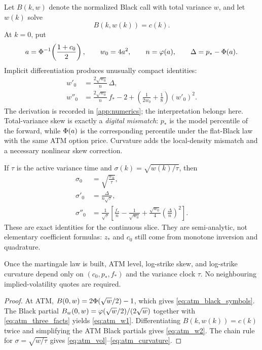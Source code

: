 \documentclass[11pt]{article}
\begin{document}
Let $B(k,w)$ denote the normalized Black call with total variance $w$, and let
$w(k)$ solve
\begin{equation}
B(k,w(k))=c(k).
\label{eq:black_inversion}
\end{equation}
At $k=0$, put
\begin{equation}
a=\Phi^{-1}\!\left(\frac{1+c_0}{2}\right),\qquad
w_0=4a^2,\qquad n=\varphi(a),\qquad
\Delta=p_*-\Phi(a).
\label{eq:atm_black_symbols}
\end{equation}
Implicit differentiation produces unusually compact identities:
\begin{align}
w'_0&=\frac{2\sqrt{w_0}}{n}\,\Delta,
\label{eq:atm_w1}\\
w''_0&=\frac{2\sqrt{w_0}}{n}\,f_*
       -2+
       \left(\frac{1}{2w_0}+\frac18\right)(w'_0)^2.
\label{eq:atm_w2}
\end{align}
The derivation is recorded in \cref{app:numerics}; the interpretation belongs
here.  Total-variance skew is exactly a \emph{digital mismatch}: $p_*$ is the
model percentile of the forward, while $\Phi(a)$ is the corresponding
percentile under the flat-Black law with the same ATM option price.  Curvature
adds the local-density mismatch and a necessary nonlinear skew correction.

If $\tau$ is the active variance time and
$\sigma(k)=\sqrt{w(k)/\tau}$, then
\begin{align}
\sigma_0&=\sqrt{\frac{w_0}{\tau}},
\label{eq:atm_vol}\\
\sigma'_0&=\frac{\Delta}{n\sqrt{\tau}},
\label{eq:atm_skew}\\
\sigma''_0&=\frac{1}{\sqrt{\tau}}
\left[
\frac{f_*}{n}-\frac{1}{\sqrt{w_0}}
+\frac{\sqrt{w_0}}{4}\left(\frac{\Delta}{n}\right)^2
\right].
\label{eq:atm_curvature}
\end{align}
These are exact identities for the continuous slice.  They are
semi-analytic, not elementary coefficient formulas: $z_*$ and $c_0$ still
come from monotone inversion and quadrature.

\begin{proposition}
\label{prop:atm}
Once the martingale law is built, ATM level, log-strike skew, and log-strike
curvature depend only on $(c_0,p_*,f_*)$ and the variance clock $\tau$.
No neighbouring implied-volatility quotes are required.
\end{proposition}

\begin{proof}
At ATM, $B(0,w)=2\Phi(\sqrt w/2)-1$, which gives
\eqref{eq:atm_black_symbols}.  The Black partial
$B_w(0,w)=\varphi(\sqrt w/2)/(2\sqrt w)$ together with
\eqref{eq:atm_three_facts} yields \eqref{eq:atm_w1}.  Differentiating
$B(k,w(k))=c(k)$ twice and simplifying the ATM Black partials gives
\eqref{eq:atm_w2}.  The chain rule for $\sigma=\sqrt{w/\tau}$ gives
\eqref{eq:atm_vol}--\eqref{eq:atm_curvature}.
\end{proof}
\end{document}

